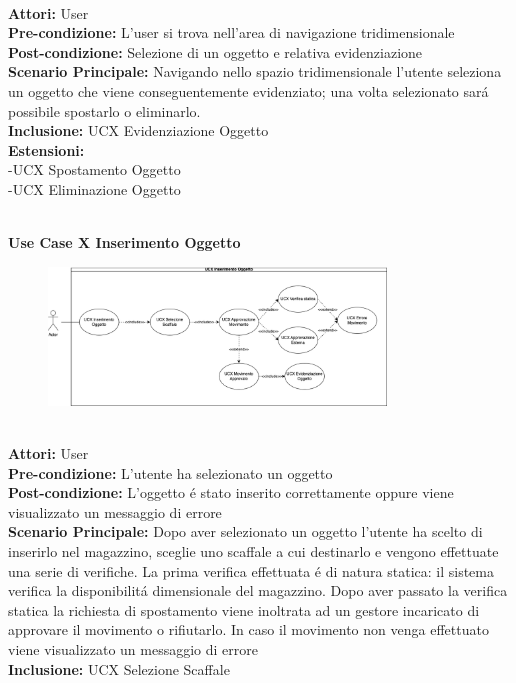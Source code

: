 \vspace{0.5cm}

\large\textbf{} \\
\textbf{Attori:} User\\
\textbf{Pre-condizione:} L'user si trova nell'area di navigazione tridimensionale \\
\textbf{Post-condizione: } Selezione di un oggetto e relativa evidenziazione\\
\textbf{Scenario Principale:}  Navigando nello spazio tridimensionale l'utente seleziona un oggetto che viene conseguentemente evidenziato; una volta selezionato sará possibile spostarlo o eliminarlo.\\
\textbf{Inclusione:} UCX Evidenziazione Oggetto \\
\textbf{Estensioni:} \\ 
-UCX Spostamento Oggetto \\ -UCX Eliminazione Oggetto

\vspace{0.5cm}


\Large\textbf{}\\
\Large\textbf{Use Case X Inserimento Oggetto} \\
\begin{figure}[h]
  \centering
  \includegraphics[width=0.8\textwidth]{UseCasesImages/Inserimento.png}
\end{figure}

\vspace{0.5cm}

\large\textbf{} \\
\textbf{Attori:} User\\
\textbf{Pre-condizione:} L'utente ha selezionato un oggetto  \\
\textbf{Post-condizione: } L'oggetto é stato inserito correttamente oppure viene visualizzato un messaggio di errore\\
\textbf{Scenario Principale:}  Dopo aver selezionato un oggetto l'utente ha scelto di inserirlo nel magazzino, sceglie uno scaffale a cui destinarlo e vengono effettuate una serie di verifiche. La prima verifica effettuata é di natura statica: il sistema verifica la disponibilitá dimensionale del magazzino. Dopo aver passato la verifica statica la richiesta di spostamento viene inoltrata ad un gestore incaricato di approvare il movimento o rifiutarlo. In caso il movimento non venga effettuato viene visualizzato un messaggio di errore \\
\textbf{Inclusione:} UCX Selezione Scaffale \\

